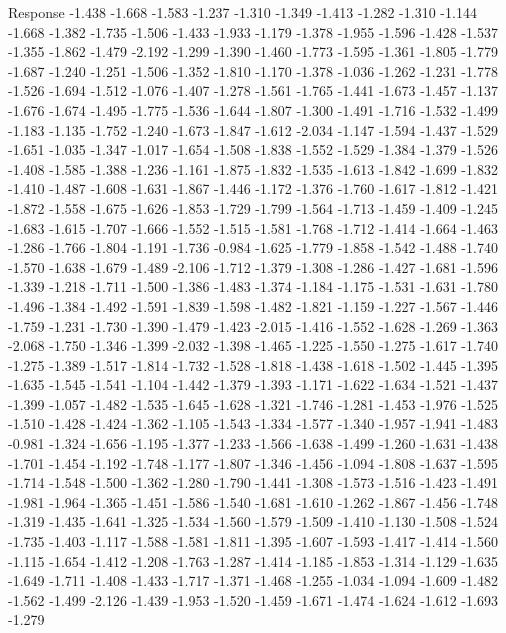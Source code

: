 \documentclass[9pt]{article}
\theoremstyle{plain}
\theoremstyle{definition}
\theoremstyle{remark}
\numberwithin{equation}{section}
\begin{document}
Response
-1.438
-1.668
-1.583
-1.237
-1.310
-1.349
-1.413
-1.282
-1.310
-1.144
-1.668
-1.382
-1.735
-1.506
-1.433
-1.933
-1.179
-1.378
-1.955
-1.596
-1.428
-1.537
-1.355
-1.862
-1.479
-2.192
-1.299
-1.390
-1.460
-1.773
-1.595
-1.361
-1.805
-1.779
-1.687
-1.240
-1.251
-1.506
-1.352
-1.810
-1.170
-1.378
-1.036
-1.262
-1.231
-1.778
-1.526
-1.694
-1.512
-1.076
-1.407
-1.278
-1.561
-1.765
-1.441
-1.673
-1.457
-1.137
-1.676
-1.674
-1.495
-1.775
-1.536
-1.644
-1.807
-1.300
-1.491
-1.716
-1.532
-1.499
-1.183
-1.135
-1.752
-1.240
-1.673
-1.847
-1.612
-2.034
-1.147
-1.594
-1.437
-1.529
-1.651
-1.035
-1.347
-1.017
-1.654
-1.508
-1.838
-1.552
-1.529
-1.384
-1.379
-1.526
-1.408
-1.585
-1.388
-1.236
-1.161
-1.875
-1.832
-1.535
-1.613
-1.842
-1.699
-1.832
-1.410
-1.487
-1.608
-1.631
-1.867
-1.446
-1.172
-1.376
-1.760
-1.617
-1.812
-1.421
-1.872
-1.558
-1.675
-1.626
-1.853
-1.729
-1.799
-1.564
-1.713
-1.459
-1.409
-1.245
-1.683
-1.615
-1.707
-1.666
-1.552
-1.515
-1.581
-1.768
-1.712
-1.414
-1.664
-1.463
-1.286
-1.766
-1.804
-1.191
-1.736
-0.984
-1.625
-1.779
-1.858
-1.542
-1.488
-1.740
-1.570
-1.638
-1.679
-1.489
-2.106
-1.712
-1.379
-1.308
-1.286
-1.427
-1.681
-1.596
-1.339
-1.218
-1.711
-1.500
-1.386
-1.483
-1.374
-1.184
-1.175
-1.531
-1.631
-1.780
-1.496
-1.384
-1.492
-1.591
-1.839
-1.598
-1.482
-1.821
-1.159
-1.227
-1.567
-1.446
-1.759
-1.231
-1.730
-1.390
-1.479
-1.423
-2.015
-1.416
-1.552
-1.628
-1.269
-1.363
-2.068
-1.750
-1.346
-1.399
-2.032
-1.398
-1.465
-1.225
-1.550
-1.275
-1.617
-1.740
-1.275
-1.389
-1.517
-1.814
-1.732
-1.528
-1.818
-1.438
-1.618
-1.502
-1.445
-1.395
-1.635
-1.545
-1.541
-1.104
-1.442
-1.379
-1.393
-1.171
-1.622
-1.634
-1.521
-1.437
-1.399
-1.057
-1.482
-1.535
-1.645
-1.628
-1.321
-1.746
-1.281
-1.453
-1.976
-1.525
-1.510
-1.428
-1.424
-1.362
-1.105
-1.543
-1.334
-1.577
-1.340
-1.957
-1.941
-1.483
-0.981
-1.324
-1.656
-1.195
-1.377
-1.233
-1.566
-1.638
-1.499
-1.260
-1.631
-1.438
-1.701
-1.454
-1.192
-1.748
-1.177
-1.807
-1.346
-1.456
-1.094
-1.808
-1.637
-1.595
-1.714
-1.548
-1.500
-1.362
-1.280
-1.790
-1.441
-1.308
-1.573
-1.516
-1.423
-1.491
-1.981
-1.964
-1.365
-1.451
-1.586
-1.540
-1.681
-1.610
-1.262
-1.867
-1.456
-1.748
-1.319
-1.435
-1.641
-1.325
-1.534
-1.560
-1.579
-1.509
-1.410
-1.130
-1.508
-1.524
-1.735
-1.403
-1.117
-1.588
-1.581
-1.811
-1.395
-1.607
-1.593
-1.417
-1.414
-1.560
-1.115
-1.654
-1.412
-1.208
-1.763
-1.287
-1.414
-1.185
-1.853
-1.314
-1.129
-1.635
-1.649
-1.711
-1.408
-1.433
-1.717
-1.371
-1.468
-1.255
-1.034
-1.094
-1.609
-1.482
-1.562
-1.499
-2.126
-1.439
-1.953
-1.520
-1.459
-1.671
-1.474
-1.624
-1.612
-1.693
-1.279
\end{document}
